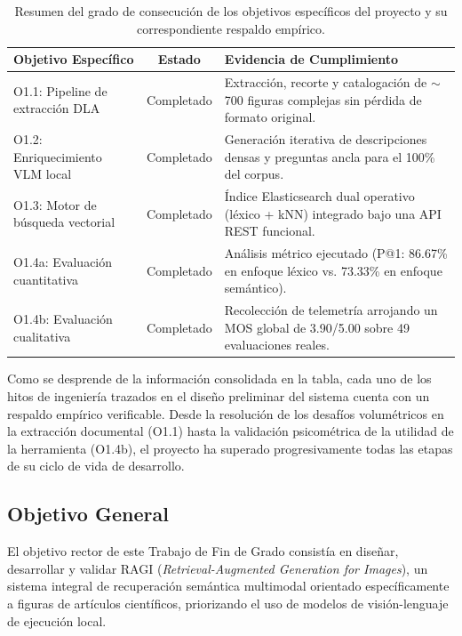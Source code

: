 \documentclass[a4paper]{report}
\begin{document}
\begin{table}[hbt!]
    \centering
    \begin{tabular}{|l|c|p{8cm}|}
        \hline
        \textbf{Objetivo Específico} & \textbf{Estado} & \textbf{Evidencia de Cumplimiento} \\ \hline
        O1.1: Pipeline de extracción DLA & Completado & Extracción, recorte y catalogación de $\sim$700 figuras complejas sin pérdida de formato original. \\ \hline
        O1.2: Enriquecimiento VLM local & Completado & Generación iterativa de descripciones densas y preguntas ancla para el 100\% del corpus. \\ \hline
        O1.3: Motor de búsqueda vectorial & Completado & Índice Elasticsearch dual operativo (léxico + kNN) integrado bajo una API REST funcional. \\ \hline
        O1.4a: Evaluación cuantitativa & Completado & Análisis métrico ejecutado (P@1: 86.67\% en enfoque léxico vs. 73.33\% en enfoque semántico). \\ \hline
        O1.4b: Evaluación cualitativa & Completado & Recolección de telemetría arrojando un MOS global de 3.90/5.00 sobre 49 evaluaciones reales. \\ \hline
    \end{tabular}
    \caption{Resumen del grado de consecución de los objetivos específicos del proyecto y su correspondiente respaldo empírico.}
    \label{tab:objetivos_logrados}
\end{table}

Como se desprende de la información consolidada en la tabla, cada uno de los hitos de ingeniería trazados en el diseño preliminar del sistema cuenta con un respaldo empírico verificable. Desde la resolución de los desafíos volumétricos en la extracción documental (O1.1) hasta la validación psicométrica de la utilidad de la herramienta (O1.4b), el proyecto ha superado progresivamente todas las etapas de su ciclo de vida de desarrollo.

\subsection{Objetivo General}
\label{subsec:objetivo_general}

El objetivo rector de este Trabajo de Fin de Grado consistía en diseñar, desarrollar y validar RAGI (\textit{Retrieval-Augmented Generation for Images}), un sistema integral de recuperación semántica multimodal orientado específicamente a figuras de artículos científicos, priorizando el uso de modelos de visión-lenguaje de ejecución local.
\end{document}
